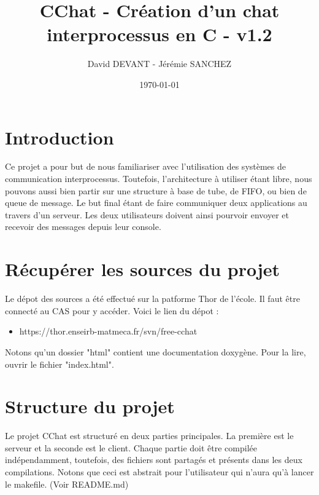 \documentclass{article}
\title{CChat - Création d'un chat interprocessus en C - v1.2}
\author{David DEVANT - Jérémie SANCHEZ}
\date{\today}
\begin{document}
	\maketitle

	\tableofcontents

	\section*{Introduction}
	\par Ce projet a pour but de nous familiariser avec l'utilisation des systèmes de communication interprocessus. Toutefois, l'architecture à utiliser étant libre, nous pouvons aussi bien partir sur une structure à base de tube, de FIFO, ou bien de queue de message. Le but final étant de faire communiquer deux applications au travers d'un serveur. Les deux utilisateurs doivent ainsi pourvoir envoyer et recevoir des messages depuis leur console.
	\newpage
	

	\section{Récupérer les sources du projet}
	\par Le dépot des sources a été effectué sur la patforme Thor de l'école. Il faut être connecté au CAS pour y accéder. Voici le lien du dépot :
	\begin{itemize}\renewcommand{\labelitemi}{$\bullet$} 
		\item https://thor.enseirb-matmeca.fr/svn/free-cchat
	\end{itemize}
	\par Notons qu'un dossier "html" contient une documentation doxygène. Pour la lire, ouvrir le fichier "index.html".

	\section{Structure du projet}
	\par Le projet CChat est structuré en deux parties principales. La première est le serveur et la seconde est le client. Chaque partie doit être compilée indépendamment, toutefois, des fichiers sont partagés et présents dans les deux compilations. Notons que ceci est abstrait pour l'utilisateur qui n'aura qu'à lancer le makefile. (Voir README.md)
	
\end{document}
